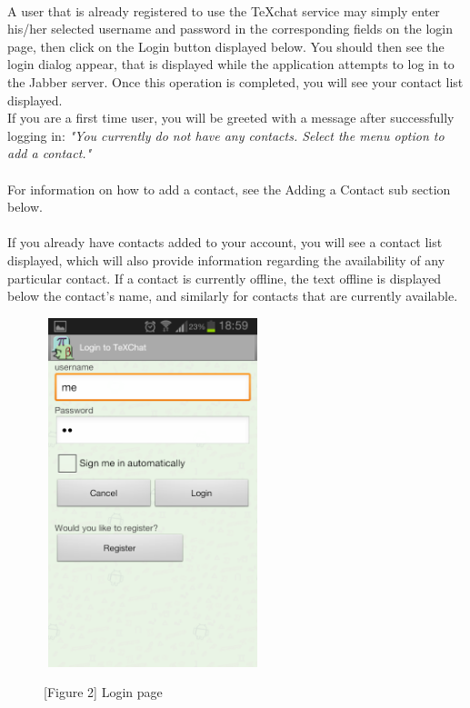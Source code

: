 \documentclass[29pt,a4paper]{moderncv}
\begin{document}
		\\A user that is already registered to use the TeXchat service may simply enter his/her selected username and password in the corresponding fields on the login page, then click on the Login button displayed below.  You should then see the login dialog appear, that is displayed while the application attempts to log in to the Jabber server.  Once this operation is completed, you will see your contact list displayed.\\ 
		
		If you are a first time user, you will be greeted with a message after successfully logging in: \textit{"You currently do not have any contacts.  Select the menu option to add a contact."} \\
		\\For information on how to add a contact, see the Adding a Contact sub section below.\\
		
		\\If you already have contacts added to your account, you will see a contact list displayed, which will also provide information regarding the availability of any particular contact.  If a contact is currently offline, the text offline is displayed below the contact’s name, and similarly for contacts that are currently available.\\
		
		\noindent\begin{figure}
							\centering
							\includegraphics[width=2.5in, height=4.0in]{./Screenshot_2013-10-23-18-59-04.png} \\
							\centering \caption{[Figure 2] Login page}
							\end{figure}\\ 
		\vspace{5mm}
\end{document}
